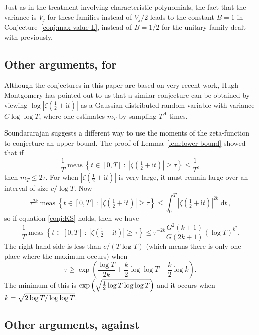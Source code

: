 \documentclass[10pt,reqno,twoside]{amsart}
\renewcommand{\d}{{\mathrm{d}}} %
\renewcommand{\i}{{\mathrm{i}}} %
\DeclareMathOperator{\meas}{meas}
\numberwithin{equation}{section}
\numberwithin{theorem}{section}
\begin{document}
{{Just as in the treatment involving characteristic polynomials, the
fact that the variance is $V_j$ for these families instead of
$V_j/2$ leads to the constant $B=1$ in Conjecture~\ref{conj:max
value L}, instead of $B=1/2$ for the unitary family dealt with
previously.



\subsection{Other arguments, for}

Although the conjectures in this paper are based on very recent
work,
Hugh Montgomery has pointed out to us that a similar conjecture can be obtained
by viewing $\log|\zeta(\frac12+\i t)|$ as a Gaussian distributed random
variable with variance $C \log\log T$, where one estimates $m_T$
by sampling $T^A$ times.

Soundararajan suggests a different way to use the moments of the
zeta-function to conjecture an upper bound.
The proof of Lemma~\ref{lem:lower bound} showed that if
\begin{equation}
\frac{1}{T}\meas\left\{ t \in [0,T] \ : \ |\zeta(\tfrac12+\i t)|
\geq \tau \right\} \leq \frac{1}{T},
\end{equation}
then $m_T \leq 2\tau$.  For when $|\zeta(\tfrac12+\i t)|$ is very
large, it must remain large over an interval of size $c/\log T$.
Now
\begin{equation}
\tau^{2k} \meas\left\{ t \in [0,T] \ : \ |\zeta(\tfrac12+\i t)|
\geq \tau \right\} \leq \int_0^T |\zeta(\tfrac12 +\i t)|^{2k} \;\d t \,,
\end{equation}
so if equation \eqref{conj:KS} holds, then we have
\begin{equation}
\frac{1}{T}\meas\left\{ t \in [0,T] \ : \ |\zeta(\tfrac12+\i t)|
\geq \tau \right\} \leq \tau^{-2k} \frac{G^2(k+1)}{G(2k+1)} (\log
T)^{k^2}.
\end{equation}
The right-hand side is less than $c/(T\log T)$  (which means  there
is only one place where the maximum occurs) when
\begin{equation}
\tau \geq \exp\left(\frac{\log T}{2k} + \frac{k}{2} \log\log T -
\frac{k}{2} \log k\right) .
\end{equation}
The minimum of this is $\exp\left(\sqrt{\mathstrut \frac12\log T \log\log
T}\right)$  and it occurs when $k=\sqrt{\mathstrut 2 \log T / \log\log T}$.

\subsection{Other arguments, against}

}}
\end{document}
